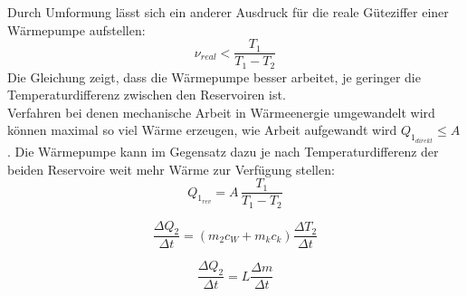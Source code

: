 Durch Umformung lässt sich ein anderer Ausdruck für die reale Güteziffer einer Wärmepumpe aufstellen:
\begin{equation}\label{eqn:guetezifferReal}
    ν_{real} < \frac{T_1}{T_1 - T_2}
\end{equation}
Die Gleichung zeigt, dass die Wärmepumpe besser arbeitet, je geringer die Temperaturdifferenz zwischen den 
Reservoiren ist.\\
Verfahren bei denen mechanische Arbeit in Wärmeenergie umgewandelt wird können maximal so viel Wärme erzeugen,
wie Arbeit aufgewandt wird $Q_{1_{direkt}} \leq A$. 
Die Wärmepumpe kann im Gegensatz dazu je nach Temperaturdifferenz der beiden Reservoire weit mehr Wärme
zur Verfügung stellen:
\begin{equation}
    Q_{1_{rev}} = A\, \frac{T_1}{T_1 - T_2}
\end{equation}


\begin{equation}\label{eqn:diffQ2}
    \frac{ΔQ_2}{Δt} = \left(m_2c_W + m_kc_k\right)\frac{ΔT_2}{Δt}
   \end{equation}
   
   \begin{equation}\label{eqn:verdampfungswaerme}
    \frac{ΔQ_2}{Δt} = L\frac{Δm}{Δt}
   \end{equation}